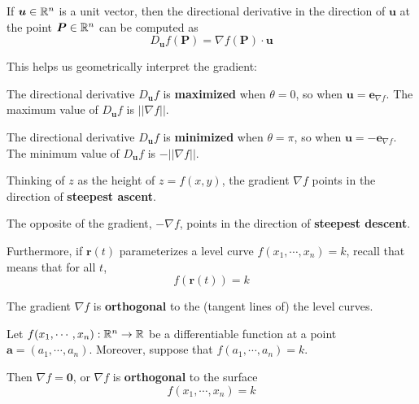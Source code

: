  \begin{corollary}
     If $\bm{u} \in \mathbb{R}^n$ is a unit vector, then the directional derivative
    in the direction of $\bm{u}$ at the point $\bm{P} \in \mathbb{R}^n$ can be computed as
    $$D_{\bm{u}} f(\bm{P}) = \nabla f(\bm{P}) \cdot \bm{u}$$
 \end{corollary}
        
This helps us geometrically interpret the gradient:

\begin{proposition}
    The directional derivative $D_{\bm{u}} f$ is \textbf{maximized} when $\theta = 0$, so when $\bm{u} = \bm{e}_{\nabla f}$.  The maximum value of $D_{\bm{u}} f$ is $||\nabla f||$.

    
    The directional derivative $D_{\bm{u}} f$ is \textbf{minimized} when $\theta = \pi$, so when $\bm{u} = -\bm{e}_{\nabla f}$.  The minimum value of $D_{\bm{u}} f$ is $-||\nabla f||$.
    \end{proposition}
    
    \begin{example}
        Thinking of $z$ as the height of $z = f(x,y)$, the gradient $\nabla f$ points in the direction of \textbf{steepest ascent}.
    
    \vspace{1em}
    
    The opposite of the gradient, $-\nabla f$, points in the direction of \textbf{steepest descent}.
    \end{example}
    
    Furthermore, if $\bm{r}(t)$ parameterizes a level curve $f(x_1, \cdots, x_n) =k$, recall that means that for all $t$, $$f(\bm{r}(t)) = k$$
    
    
    \begin{proposition}
    The gradient $\nabla f$ is \textbf{orthogonal} to the (tangent lines of) the level curves.
    \end{proposition}







\begin{corollary}
    Let $f(x_1,\cdots,x_n) : \mathbb{R}^n \to \mathbb{R}$ be a differentiable function at a point $\bm{a} = (a_1,\cdots, a_n)$.  Moreover, suppose that $f(a_1,\cdots,a_n) = k$.  
    
    Then $\nabla f = \bm{0}$, or $\nabla f$ is \textbf{orthogonal} to the surface $$f(x_1,\cdots,x_n) = k$$
    \end{corollary}




